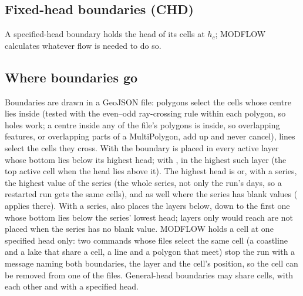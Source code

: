 \subsection{Fixed-head boundaries (CHD)}
A specified-head boundary holds the head of its cells at $h_c$; MODFLOW calculates whatever flow is needed to do so.

\subsection{Where boundaries go}
Boundaries are drawn in a GeoJSON file: polygons select the cells whose centre lies inside (tested with the even--odd
ray-crossing rule within each polygon, so holes work; a centre inside any of the file's polygons is inside, so
overlapping features, or overlapping parts of a MultiPolygon, add up and never cancel), lines select the cells they cross. With  the boundary is placed in
every active layer whose bottom lies below its highest head; with , in the highest such layer (the top
active cell when the head lies above it). The highest head is  or, with a  series, the
highest value of the series (the whole series, not only the run's days, so a restarted run gets the same cells), and
 as well where the series has blank values ( applies there). With a series,  also places
the layers below, down to the first one whose bottom lies below the series' lowest head; layers only  would
reach are not placed when the series has no blank value. MODFLOW holds a cell at one specified head only: two
 commands whose files select the same cell (a coastline and a lake that share a cell, a line
and a polygon that meet) stop the run with a message naming both boundaries, the layer and the cell's position, so
the cell can be removed from one of the files. General-head boundaries may share cells, with each other and with a
specified head.


